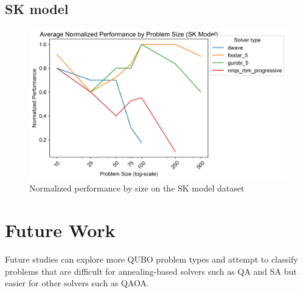 \subsection{SK model}
\begin{figure}[!h]
    \centering
    \includegraphics[width=1\linewidth]{images/skmodel_normalized_performance_all.png}
    \caption{Normalized performance by size on the SK model dataset}
    \label{all-skmodel-size}
\end{figure}

\section{Future Work}
Future studies can explore more QUBO problem types and attempt to classify problems that are difficult for annealing-based solvers such as QA and SA but easier for other solvers such as QAOA.
